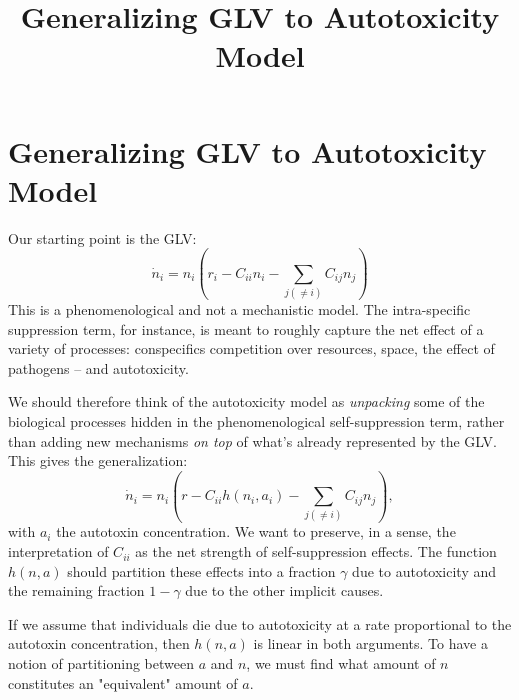 \documentclass{article}
\title{Generalizing GLV to Autotoxicity Model}
\date{}
\begin{document}
\maketitle

\section{Generalizing GLV to Autotoxicity Model}

Our starting point is the GLV:
\begin{equation}
\dot{n}_i = n_i\left( r_i - C_{ii} n_i - \sum_{j(\neq i)} C_{ij} n_j \right)
\end{equation}
This is a phenomenological and not a mechanistic model. The intra-specific suppression term, for instance, is meant to roughly capture the net effect of a variety of processes: conspecifics competition over resources, space, the effect of pathogens -- and autotoxicity. 

We should therefore think of the autotoxicity model as \emph{unpacking} some of the biological processes hidden in the phenomenological self-suppression term, rather than adding new mechanisms \emph{on top} of what's already represented by the GLV. This gives the generalization:
\begin{equation}
\dot{n}_i = n_i\left( r - C_{ii} h(n_i,a_i) - \sum_{j(\neq i)} C_{ij} n_j \right),
\end{equation}
with $a_i$ the autotoxin concentration. We want to preserve, in a sense, the interpretation of $C_{ii}$ as the net strength of self-suppression effects. The function $h(n,a)$ should partition these effects into a fraction $\gamma$ due to autotoxicity and the remaining fraction $1-\gamma$ due to the other implicit causes.

If we assume that individuals die due to autotoxicity at a rate proportional to the autotoxin concentration, then $h(n,a)$ is linear in both arguments. To have a notion of partitioning between $a$ and $n$, we must find what amount of $n$ constitutes an "equivalent" amount of $a$.
\end{document}
